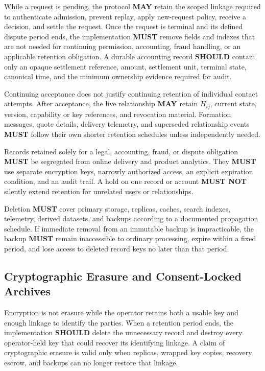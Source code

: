 \documentclass[11pt]{article}
\newcommand{\MUST}{\textbf{MUST}}
\newcommand{\MUSTNOT}{\textbf{MUST NOT}}
\newcommand{\SHOULD}{\textbf{SHOULD}}
\newcommand{\MAY}{\textbf{MAY}}
\begin{document}
While a request is pending, the protocol \MAY{} retain the scoped linkage required
to authenticate admission, prevent replay, apply new-request policy, receive
a decision, and settle the request. Once the request is terminal and its defined
dispute period ends, the implementation \MUST{} remove fields and indexes that are
not needed for continuing permission, accounting, fraud handling, or an applicable
retention obligation. A durable accounting record \SHOULD{} contain only an
opaque settlement reference, amount, settlement unit, terminal state, canonical
time, and the minimum ownership evidence required for audit.

Continuing acceptance does not justify continuing retention of individual contact
attempts. After acceptance, the live relationship \MAY{} retain $H_{ij}$, current
state, version, capability or key references, and revocation material. Formation
messages, quote details, delivery telemetry, and superseded relationship events
\MUST{} follow their own shorter retention schedules unless independently needed.

Records retained solely for a legal, accounting, fraud, or dispute obligation
\MUST{} be segregated from online delivery and product analytics. They \MUST{} use
separate encryption keys, narrowly authorized access, an explicit expiration
condition, and an audit trail. A hold on one record or account \MUSTNOT{} silently
extend retention for unrelated users or relationships.

Deletion \MUST{} cover primary storage, replicas, caches, search indexes,
telemetry, derived datasets, and backups according to a documented propagation
schedule. If immediate removal from an immutable backup is impracticable, the
backup \MUST{} remain inaccessible to ordinary processing, expire within a fixed
period, and lose access to deleted record keys no later than that period.

\subsection{Cryptographic Erasure and Consent-Locked Archives}

Encryption is not erasure while the operator retains both a usable key and enough
linkage to identify the parties. When a retention period ends, the implementation
\SHOULD{} delete the unnecessary record and destroy every operator-held key that
could recover its identifying linkage. A claim of cryptographic erasure is valid
only when replicas, wrapped key copies, recovery escrow, and backups can no longer
restore that linkage.
\end{document}
